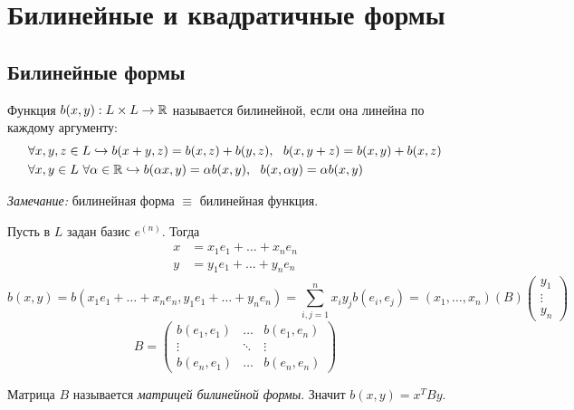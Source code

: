 \section{Билинейные и квадратичные формы}
\subsection{Билинейные формы}
\begin{definition}
    Функция $b(x,y):L\times L\to \mathbb{R}$ называется билинейной, если она линейна по каждому аргументу:
    \begin{align*}
        &\forall x, y, z \in L \hookrightarrow b(x+y,z)=b(x,z)+b(y,z), \ \ b(x, y+z)=b(x,y)+b(x,z)\\
        &\forall x,y\in L \ \forall \alpha \in \mathbb{R} \hookrightarrow b(\alpha x, y)=\alpha b(x,y), \ \ b(x, \alpha y)=\alpha b(x,y)
    \end{align*}
\end{definition}
\textit{Замечание:} билинейная форма $\equiv$ билинейная функция.

Пусть в $L$ задан базис $e^{(n)}$. Тогда 
\begin{align*}
    x &=x_1e_1+\dots +x_ne_n \\
    y &= y_1e_1+\dots+y_ne_n 
\end{align*}
\[
b(x,y)=b(x_1e_1+\dots +x_ne_n, y_1e_1+\dots+y_ne_n)=\sum_{i,j=1}^nx_iy_jb(e_i,e_j)=(x_1, \dots, x_n)(B)\begin{pmatrix}
    y_1 \\
    \vdots \\
    y_n
\end{pmatrix}
\]
$$B=\begin{pmatrix}
    b(e_1,e_1) & \dots & b(e_1,e_n) \\
    \vdots & \ddots & \vdots \\
    b(e_n,e_1) & \dots & b(e_n, e_n)
\end{pmatrix}$$

Матрица $B$ называется \textit{матрицей билинейной формы}. Значит $b(x,y)=x^TBy$.
